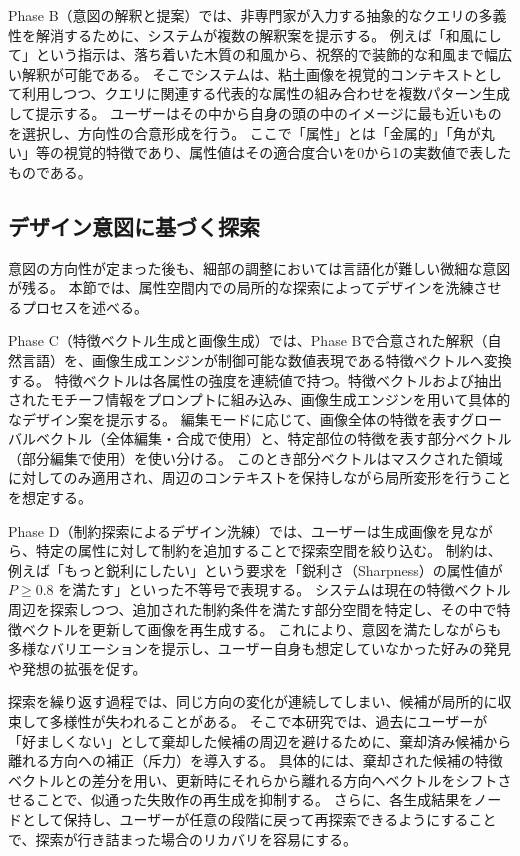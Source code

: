 \documentclass{kuisthesis}
\begin{document}
Phase B（意図の解釈と提案）では、非専門家が入力する抽象的なクエリの多義性を解消するために、システムが複数の解釈案を提示する。
例えば「和風にして」という指示は、落ち着いた木質の和風から、祝祭的で装飾的な和風まで幅広い解釈が可能である。
そこでシステムは、粘土画像を視覚的コンテキストとして利用しつつ、クエリに関連する代表的な属性の組み合わせを複数パターン生成して提示する。
ユーザーはその中から自身の頭の中のイメージに最も近いものを選択し、方向性の合意形成を行う。
ここで「属性」とは「金属的」「角が丸い」等の視覚的特徴であり、属性値はその適合度合いを0から1の実数値で表したものである。

\subsection{デザイン意図に基づく探索}
意図の方向性が定まった後も、細部の調整においては言語化が難しい微細な意図が残る。
本節では、属性空間内での局所的な探索によってデザインを洗練させるプロセスを述べる。

Phase C（特徴ベクトル生成と画像生成）では、Phase Bで合意された解釈（自然言語）を、画像生成エンジンが制御可能な数値表現である特徴ベクトルへ変換する。
特徴ベクトルは各属性の強度を連続値で持つ。特徴ベクトルおよび抽出されたモチーフ情報をプロンプトに組み込み、画像生成エンジンを用いて具体的なデザイン案を提示する。
編集モードに応じて、画像全体の特徴を表すグローバルベクトル（全体編集・合成で使用）と、特定部位の特徴を表す部分ベクトル（部分編集で使用）を使い分ける。
このとき部分ベクトルはマスクされた領域に対してのみ適用され、周辺のコンテキストを保持しながら局所変形を行うことを想定する。

Phase D（制約探索によるデザイン洗練）では、ユーザーは生成画像を見ながら、特定の属性に対して制約を追加することで探索空間を絞り込む。
制約は、例えば「もっと鋭利にしたい」という要求を「鋭利さ（Sharpness）の属性値が $P \ge 0.8$ を満たす」といった不等号で表現する。
システムは現在の特徴ベクトル周辺を探索しつつ、追加された制約条件を満たす部分空間を特定し、その中で特徴ベクトルを更新して画像を再生成する。
これにより、意図を満たしながらも多様なバリエーションを提示し、ユーザー自身も想定していなかった好みの発見や発想の拡張を促す。

探索を繰り返す過程では、同じ方向の変化が連続してしまい、候補が局所的に収束して多様性が失われることがある。
そこで本研究では、過去にユーザーが「好ましくない」として棄却した候補の周辺を避けるために、棄却済み候補から離れる方向への補正（斥力）を導入する。
具体的には、棄却された候補の特徴ベクトルとの差分を用い、更新時にそれらから離れる方向へベクトルをシフトさせることで、似通った失敗作の再生成を抑制する。
さらに、各生成結果をノードとして保持し、ユーザーが任意の段階に戻って再探索できるようにすることで、探索が行き詰まった場合のリカバリを容易にする。
\end{document}
